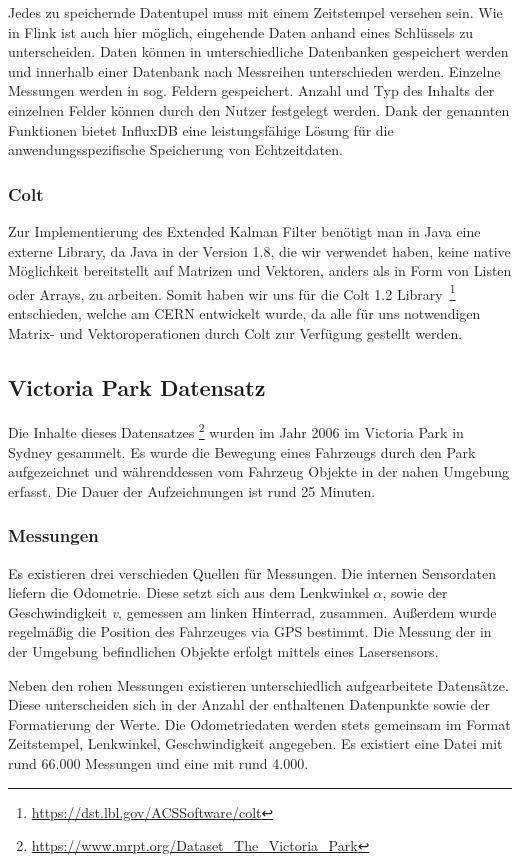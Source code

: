 \documentclass[11pt]{article}
\begin{document}
Jedes zu speichernde Datentupel muss mit einem Zeitstempel versehen sein. Wie in Flink ist auch hier möglich, eingehende Daten anhand eines Schlüssels zu unterscheiden. Daten können in unterschiedliche Datenbanken gespeichert werden und innerhalb einer Datenbank nach Messreihen unterschieden werden. Einzelne Messungen werden in sog. Feldern gespeichert. Anzahl und Typ des Inhalts der einzelnen Felder können durch den Nutzer festgelegt werden. Dank der genannten Funktionen bietet InfluxDB eine leistungsfähige Lösung für die anwendungsspezifische Speicherung von Echtzeitdaten.

\subsubsection{Colt}
Zur Implementierung des Extended Kalman Filter benötigt man in Java eine externe Library, da Java in der Version 1.8, die wir verwendet haben, keine native Möglichkeit bereitstellt auf Matrizen und Vektoren, anders als in Form von Listen oder Arrays, zu arbeiten. Somit haben wir uns für die Colt 1.2 Library~\footnote{\url{https://dst.lbl.gov/ACSSoftware/colt}} entschieden, welche am CERN entwickelt wurde, da alle für uns notwendigen Matrix- und Vektoroperationen durch Colt zur Verfügung gestellt werden.

\subsection{Victoria Park Datensatz}
Die Inhalte dieses Datensatzes \footnote{\url{https://www.mrpt.org/Dataset_The_Victoria_Park}} wurden im Jahr 2006 im Victoria Park in Sydney gesammelt. Es wurde die Bewegung eines Fahrzeugs durch den Park aufgezeichnet und währenddessen vom Fahrzeug Objekte in der nahen Umgebung erfasst. Die Dauer der Aufzeichnungen ist rund 25 Minuten.

\subsubsection{Messungen}
Es existieren drei verschieden Quellen für Messungen. Die internen Sensordaten liefern die Odometrie. Diese setzt sich aus dem Lenkwinkel \(\alpha\), sowie der Geschwindigkeit \textit{v}, gemessen am linken Hinterrad, zusammen. Außerdem wurde regelmäßig die Position des Fahrzeuges via GPS bestimmt. Die Messung der in der Umgebung befindlichen Objekte erfolgt mittels eines Lasersensors.

Neben den rohen Messungen existieren unterschiedlich aufgearbeitete Datensätze. Diese unterscheiden sich in der Anzahl der enthaltenen Datenpunkte sowie der Formatierung der Werte. Die Odometriedaten werden stets gemeinsam im Format {Zeitstempel, Lenkwinkel, Geschwindigkeit} angegeben. Es existiert eine Datei mit rund 66.000 Messungen und eine mit rund 4.000.
\end{document}
